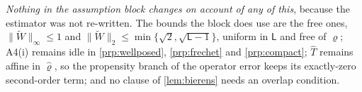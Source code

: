 \emph{Nothing in the assumption block changes on account of any of this}, because the estimator was not
re-written. The bounds the block does use are the free ones, $\|\widetilde W\|_\infty\le1$ and
$\|\widetilde W\|_2\le\min\{\sqrt2,\sqrt{\mathsf L-1}\}$, uniform in $\mathsf L$ and free of $\varrho$;
A4(i) remains idle in \cref{prp:wellposed}, \cref{prp:frechet} and \cref{prp:compact};
$\hat T$ remains affine in $\hat\varrho$, so the propensity branch of the operator error keeps its
exactly-zero second-order term; and no clause of \cref{lem:bierens} needs an overlap condition.



